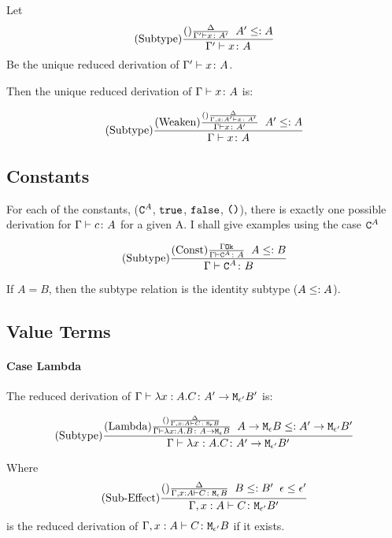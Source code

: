 {    Let 
    \begin{equation}
        (\text{Subtype}) \frac{(\text{}) \frac{\Delta}{\Gamma' \vdash x \colon A'}\;\; A' \leq: A}{\Gamma' \vdash x \colon A}
    \end{equation}
    Be the  unique reduced derivation of $\Gamma' \vdash x \colon A$.

    Then the unique reduced derivation of $\Gamma \vdash x \colon A$ is:


    \begin{equation}
        (\text{Subtype}) \frac{
            (\text{Weaken}) \frac{
                (\text{}) \frac{\Delta}{\Gamma, x: A' \vdash x \colon A'}
            }{\Gamma \vdash x \colon A'}   
        \;\; A' \leq: A
        }{\Gamma \vdash x \colon A}
    \end{equation}

    \subsection{Constants}
    For each of the constants, ($\texttt{C}^{A}$, $\texttt{true}$, $\texttt{false}$, $\texttt{()}$), there is exactly one possible derivation for $\Gamma \vdash c \colon A$ for a given A. I shall give examples using the case $\texttt{C}^{A}$


    $$
        (\text{Subtype}) \frac{(\text{Const}) \frac{\Gamma \texttt{Ok}}{\Gamma \vdash \texttt{C}^{A} \colon A}\;\; A \leq: B}{\Gamma \vdash \texttt{C}^{A} \colon B}
    $$

    If $A = B$, then the subtype relation is the identity subtype ($A \leq: A$).

    \subsection{Value Terms}
    \paragraph{Case Lambda}
    The reduced derivation of $\Gamma \vdash \lambda x : A. C \colon A' \rightarrow \texttt{M}_{\epsilon'}{B'}$ is:


    $$
    (\text{Subtype}) \frac{(\text{Lambda}) \frac{(\text{}) \frac{\Delta}{\Gamma, x: A \vdash C \colon \texttt{M}_{\epsilon}{B}}}{
        \Gamma \vdash \lambda x : A. B \colon A \rightarrow \texttt{M}_{\epsilon}{B}}
        \;\;
        A \rightarrow \texttt{M}_{\epsilon}{B} \leq: A' \rightarrow \texttt{M}_{\epsilon'}{B'}
    }{
       \Gamma \vdash \lambda x : A. C \colon A' \rightarrow \texttt{M}_{\epsilon'}{B'} 
    }
    $$

    Where 
    \begin{equation}
        (\text{Sub-Effect}) \frac{(\text{}) \frac{\Delta}{\Gamma, x: A \vdash C \colon \texttt{M}_{\epsilon}{B}}\;\; B\leq: B'\;\; \epsilon \leq \epsilon'}{\Gamma, x: A \vdash C \colon \texttt{M}_{\epsilon'}{B'}}
    \end{equation}
    is the reduced derivation of $\Gamma, x: A \vdash C \colon \texttt{M}_{\epsilon'}{B}$ if it exists.

}
